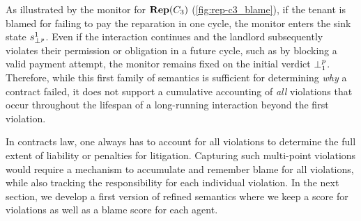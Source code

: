 As illustrated by the monitor for $\mathbf{Rep}(C_3)$ (\ref{fig:rep-c3_blame}), if the tenant is blamed for failing to pay the reparation in one cycle, the monitor enters the sink state $s_{\bot^p}^1$. 
Even if the interaction continues and the landlord subsequently violates their permission or obligation in a future cycle, such as by blocking a valid payment attempt, the monitor remains fixed on the initial verdict $\mathbin{\bot^{p}_{1}}$. 
Therefore, while this first family of semantics is sufficient for determining \emph{why} a contract failed, it does not support a cumulative accounting of \emph{all} violations that occur throughout the lifespan of a long-running interaction beyond the first violation.

 In contracts law, one always has to account for all violations to determine the full extent of liability or penalties for litigation.
Capturing such multi-point violations would require a mechanism to accumulate and remember blame for all violations, while also tracking the responsibility for each individual violation. 
In the next section, we develop a first version of refined semantics where we keep a score for violations as well as a blame score for each agent.




